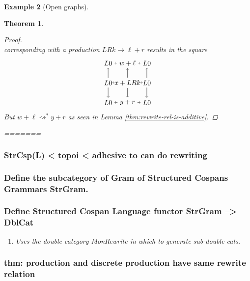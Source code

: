 \documentclass{amsart}
\newcommand{\deriv}[2]{#1 \rightsquigarrow^\ast #2}
\newtheorem{theorem}{Theorem}[section]
\theoremstyle{remark}
\theoremstyle{definition}
\newtheorem{example}[theorem]{Example}
\begin{document}
\begin{example}[Open graphs]
{{\begin{theorem}
\begin{proof}
\[  \]
  corresponding with a production $ LRk \to \ell + r $ results in the
  square
  \[
    \begin{tikzpicture}
      \node (1t) at (0,2) {$ L 0 $};
      \node (2t) at (1,2) {$ w + \ell $};
      \node (3t) at (2,2) {$ L 0 $};
      \node (1m) at (0,1) {$ L 0 $};
      \node (2m) at (1,1) {$ x + LRk $};
      \node (3m) at (2,1) {$ L 0 $};
      \node (1b) at (0,0) {$ L 0 $};
      \node (2b) at (1,0) {$ y + r $};
      \node (3b) at (2,0) {$ L 0 $};
      \draw [->] (2t) to node [] {\scriptsize{$  $}} (1t);
      \draw [->] (2t) to node [] {\scriptsize{$  $}} (3t);
      \draw [->] (2m) to node [] {\scriptsize{$  $}} (1m);
      \draw [->] (2m) to node [] {\scriptsize{$  $}} (3m);
      \draw [->] (2b) to node [] {\scriptsize{$  $}} (1b);
      \draw [->] (2b) to node [] {\scriptsize{$  $}} (3b);
      \draw [->] (1m) to node [] {\scriptsize{$  $}} (1t);
      \draw [->] (2m) to node [] {\scriptsize{$  $}} (2t);
      \draw [->] (3m) to node [] {\scriptsize{$  $}} (3t);
      \draw [->] (1m) to node [] {\scriptsize{$  $}} (1b);
      \draw [->] (2m) to node [] {\scriptsize{$  $}} (2b);
      \draw [->] (3m) to node [] {\scriptsize{$  $}} (3b);
    \end{tikzpicture}
  \]
  But $ \deriv{w+\ell}{y+r} $ as seen in Lemma
  \ref{thm:rewrite-rel-is-additive}. 

\end{proof}
=======
\label{sec-3-4}

\subsubsection{StrCsp(L) < topoi < adhesive to can do rewriting}
\label{sec-3-4-1}
\subsubsection{Define the subcategory of Gram of Structured Cospans Grammars StrGram.}
\label{sec-3-4-2}
\subsubsection{Define Structured Cospan Language functor StrGram --> DblCat}
\label{sec-3-4-3}
\begin{enumerate}
\item Uses the double category MonRewrite in which to generate sub-double cats.
\label{sec-3-4-3-1}
\end{enumerate}
\subsubsection{thm: production and discrete production have same rewrite relation}
\label{sec-3-4-4}

\end{theorem}}}
\end{example}
\end{document}
